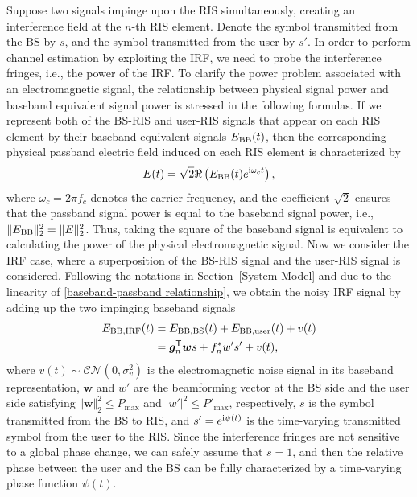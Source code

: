 \documentclass[journal,twocolumn]{IEEEtran}
\theoremstyle{nonumberplain}
\def \T {\bm \Theta}
\def \T {^{\mathsf{T}}}
\def \ri {{\rm i}}
\begin{document}
    Suppose two signals impinge upon the RIS simultaneously, creating an interference field at the $n$-th RIS element. Denote the symbol transmitted from the \ac{BS} by $s$, and the symbol transmitted from the user by $s'$. In order to perform channel estimation by exploiting the \ac{IRF}, we need to probe the interference fringes, i.e., the power of the \ac{IRF}. To clarify the power problem associated with an electromagnetic signal, the relationship between physical signal power and baseband equivalent signal power is stressed in the following formulas. 
    If we represent both of the BS-RIS and user-RIS signals that appear on each RIS element by their baseband equivalent signals $E_{{\rm BB}}(t)$, 
    then the corresponding physical passband electric field induced on each RIS element is characterized by 
    \begin{equation}
        E(t) = \sqrt{2} \Re\left( E_{{\rm BB}}(t)e^{\ri\omega_c t} \right),
        \label{baseband-passband relationship}
    \end{equation}
    where $\omega_c = 2\pi f_c$ denotes the carrier frequency, and the coefficient $\sqrt{2}$ ensures that the passband signal power is equal to the baseband signal power, i.e., 
    $\lVert E_{{\rm BB}}\rVert_2^2 = \lVert E\rVert_2^2$. 
    Thus, taking the square of the baseband signal is equivalent to calculating the power of the physical electromagnetic signal. 
    Now we consider the IRF case, where a superposition of the BS-RIS signal and the user-RIS signal is considered. 
    Following the notations in Section~\ref{System Model} and due to the linearity of \eqref{baseband-passband relationship}, we obtain the noisy IRF signal by adding up the two impinging baseband signals
    \begin{equation}
        \begin{aligned}
            E_{{\rm BB, IRF}}(t) &= E_{{\rm BB, BS}}(t)+E_{{\rm BB,user}}(t)+v(t)\\
            &=\bm g_{n}\T\bm w s+f_{n}^{*} w' s' +v(t),
        \end{aligned}
    \end{equation}
    where $v(t)\sim \mathcal{CN}(0,\sigma_{v}^{2})$ is the electromagnetic noise signal in its baseband representation,
    $\bm w$ and $w'$ are the beamforming vector at the BS side and the user side satisfying $\Vert \bm w \Vert_{2}^{2}\leq P_{\text{max}}$ and $|w'|^{2}\leq P'_{\text{max}}$, respectively,
    $s$ is the symbol transmitted from the BS to RIS, and $s'=e^{\ri \psi(t)}$ is the time-varying transmitted symbol from the user to the RIS.  
    Since the interference fringes are not sensitive to a global phase change, we can safely assume that $s=1$, and then the relative phase between the user and the BS can be fully characterized by a time-varying phase function $\psi(t)$.  
\end{document}

